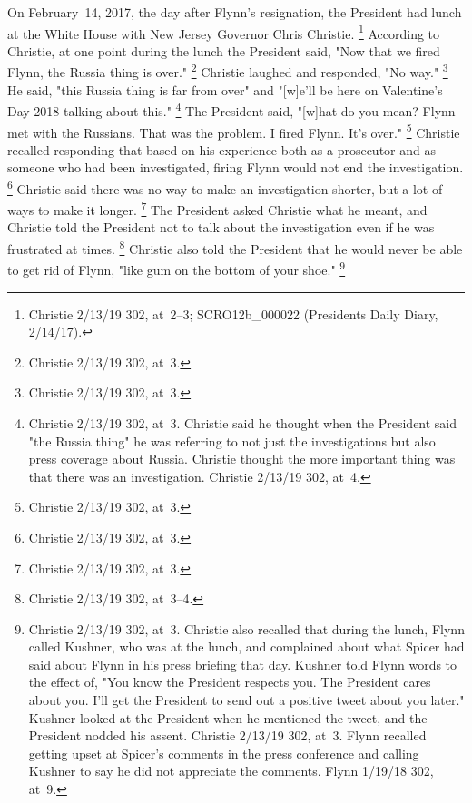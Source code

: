 On February~14, 2017, the day after Flynn's resignation, the President had lunch at the White House with New Jersey Governor Chris Christie.%
\footnote{Christie 2/13/19 302, at~2--3;
SCRO12b\_000022 (Presidents Daily Diary, 2/14/17).}
According to Christie, at one point during the lunch the President said, "Now that we fired Flynn, the Russia thing is over."%
\footnote{Christie 2/13/19 302, at~3.}
Christie laughed and responded, "No way."%
\footnote{Christie 2/13/19 302, at~3.}
He said, "this Russia thing is far from over" and "[w]e'll be here on Valentine's Day 2018 talking about this."%
\footnote{Christie 2/13/19 302, at~3.
Christie said he thought when the President said "the Russia thing" he was referring to not just the investigations but also press coverage about Russia.
Christie thought the more important thing was that there was an investigation.
Christie 2/13/19 302, at~4.}
The President said, "[w]hat do you mean?
Flynn met with the Russians.
That was the problem.
I fired Flynn.
It's over."%
\footnote{Christie 2/13/19 302, at~3.}
Christie recalled responding that based on his experience both as a prosecutor and as someone who had been investigated, firing Flynn would not end the investigation.%
\footnote{Christie 2/13/19 302, at~3.}
Christie said there was no way to make an investigation shorter, but a lot of ways to make it longer.%
\footnote{Christie 2/13/19 302, at~3.}
The President asked Christie what he meant, and Christie told the President not to talk about the investigation even if he was frustrated at times.%
\footnote{Christie 2/13/19 302, at~3--4.}
Christie also told the President that he would never be able to get rid of Flynn, "like gum on the bottom of your shoe."%
\footnote{Christie 2/13/19 302, at~3.
Christie also recalled that during the lunch, Flynn called Kushner, who was at the lunch, and complained about what Spicer had said about Flynn in his press briefing that day.
Kushner told Flynn words to the effect of, "You know the President respects you.
The President cares about you.
I'll get the President to send out a positive tweet about you later."
Kushner looked at the President when he mentioned the tweet, and the President nodded his assent.
Christie 2/13/19 302, at~3.
Flynn recalled getting upset at Spicer's comments in the press conference and calling Kushner to say he did not appreciate the comments.
Flynn 1/19/18 302, at~9.}

